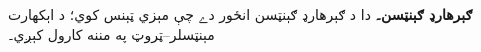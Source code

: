 \textbf{ګېرهارډ ګېنټسن۔} دا د ګېرهارډ ګېنټسن انځور دے چې مېزي ټېنس کوي؛ د اېکهارت مېنټسلر--ټروټ په مننه کارول کېږي۔
